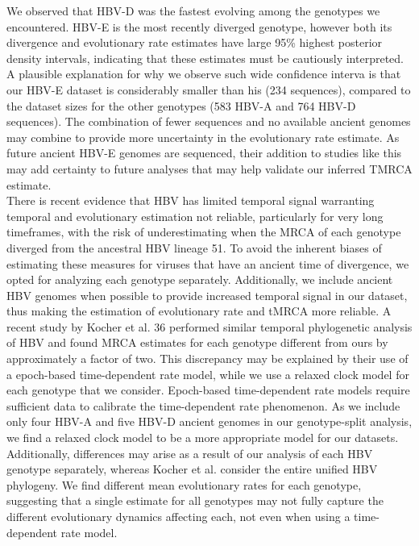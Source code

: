 We observed that HBV-D was the fastest evolving among the genotypes we encountered. HBV-E is the most recently diverged genotype, however both its divergence and evolutionary rate estimates have large 95\% highest posterior density intervals, indicating that these estimates must be cautiously interpreted. A plausible explanation for why we observe such wide confidence interva is that our HBV-E dataset is considerably smaller than his (234 sequences), compared to the dataset sizes for the other genotypes (583 HBV-A and 764 HBV-D sequences). The combination of fewer sequences and no available ancient genomes may combine to provide more uncertainty in the evolutionary rate estimate. As future ancient HBV-E genomes are sequenced, their addition to studies like this may add certainty to future analyses that may help validate our inferred TMRCA estimate.\\

There is recent evidence that HBV has limited temporal signal warranting temporal and evolutionary estimation not reliable, particularly for very long timeframes, with the risk of underestimating when the MRCA of each genotype diverged from the ancestral HBV lineage 51. To avoid the inherent biases of estimating these measures for viruses that have an ancient time of divergence, we opted for analyzing each genotype separately. Additionally, we include ancient HBV genomes when possible to provide increased temporal signal in our dataset, thus making the estimation of evolutionary rate and tMRCA more reliable. A recent study by Kocher et al. 36 performed similar temporal phylogenetic analysis of HBV and found MRCA estimates for each genotype different from ours by approximately a factor of two. This discrepancy may be explained by their use of a epoch-based time-dependent rate model, while we use a relaxed clock model for each genotype that we consider. Epoch-based time-dependent rate models require sufficient data to calibrate the time-dependent rate phenomenon. As we include only four HBV-A and five HBV-D ancient genomes in our genotype-split analysis, we find a relaxed clock model to be a more appropriate model for our datasets. Additionally, differences may arise as a result of our analysis of each HBV genotype separately, whereas Kocher et al. consider the entire unified HBV phylogeny. We find different mean evolutionary rates for each genotype, suggesting that a single estimate for all genotypes may not fully capture the different evolutionary dynamics affecting each, not even when using a time-dependent rate model.\\


